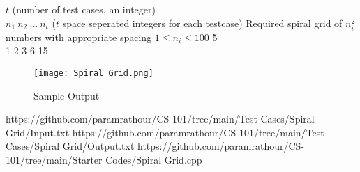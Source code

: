 \begin{testcasesMore}
	{$t$ \hfill(number of test cases, an integer)\\$n_1\ n_2\ \ldots\ n_t$ \hfill($t$ space seperated integers for each testcase)}
	{Required spiral grid of $n_i^2$ numbers with appropriate spacing}
	{$1 \leq n_i \leq 100$}
	{5\\1 2 3 6 15}
	{\vspace{-2em}\begin{figure}[H]
		\texttt{[image: Spiral Grid.png]}
		\caption{Sample Output}
		\label{fig:spiralgrid}
	\end{figure}
	}
	{https://github.com/paramrathour/CS-101/tree/main/Test Cases/Spiral Grid/Input.txt}
	{https://github.com/paramrathour/CS-101/tree/main/Test Cases/Spiral Grid/Output.txt}
	{https://github.com/paramrathour/CS-101/tree/main/Starter Codes/Spiral Grid.cpp}
\end{testcasesMore}
